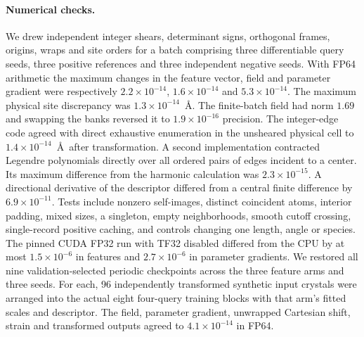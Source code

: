 \paragraph{Numerical checks.}
We drew independent integer shears, determinant signs, orthogonal frames, origins,
wraps and site orders for a batch comprising three differentiable query seeds,
three positive references and three independent negative seeds. With FP64 arithmetic
the maximum changes in the feature vector, field and parameter gradient were respectively
$2.2\times10^{-14}$, $1.6\times10^{-14}$ and $5.3\times10^{-14}$.
The maximum physical site discrepancy was $1.3\times10^{-14}$~\AA.
The finite-batch field had norm $1.69$ and swapping the banks reversed it to
$1.9\times10^{-16}$ precision. The integer-edge code agreed with direct exhaustive
enumeration in the unsheared physical cell to $1.4\times10^{-14}$~\AA\ after transformation.
A second implementation contracted Legendre polynomials directly over all ordered
pairs of edges incident to a center. Its maximum difference from the harmonic calculation
was $2.3\times10^{-15}$. A directional derivative of the descriptor differed from a
central finite difference by $6.9\times10^{-11}$. Tests include nonzero self-images,
distinct coincident atoms, interior padding, mixed sizes, a singleton, empty neighborhoods,
smooth cutoff crossing, single-record positive caching, and controls changing one length,
angle or species. The pinned CUDA FP32 run with TF32 disabled differed from the CPU by
at most $1.5\times10^{-6}$ in features and $2.7\times10^{-6}$ in parameter gradients.
We restored all nine validation-selected periodic checkpoints across the three feature
arms and three seeds. For each, 96 independently transformed synthetic input crystals
were arranged into the actual eight four-query training blocks with that arm's fitted
scales and descriptor. The field, parameter gradient, unwrapped Cartesian shift, strain
and transformed outputs agreed to $4.1\times10^{-14}$ in FP64.


